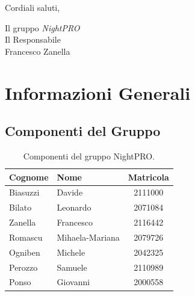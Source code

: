 \documentclass[a4paper, 11pt, oneside]{scrartcl} %
\begin{document}
\vspace{0.5cm}

Cordiali saluti,
\begin{flushright}
    Il gruppo \emph{NightPRO}\\[1cm]
    Il Responsabile\\[0.3cm]
    Francesco Zanella
\end{flushright}

\newpage
\section*{Informazioni Generali}

\subsection*{Componenti del Gruppo}

\begin{table}[h!]
\centering
\renewcommand{\arraystretch}{1.2} %
\begin{tabular}{@{}llc@{}}
\toprule
\textbf{Cognome} & \textbf{Nome} & \textbf{Matricola} \\
\midrule
Biasuzzi & Davide & 2111000 \\
Bilato & Leonardo & 2071084 \\
Zanella & Francesco & 2116442 \\
Romascu & Mihaela-Mariana & 2079726 \\
Ogniben & Michele & 2042325 \\
Perozzo & Samuele & 2110989 \\
Ponso & Giovanni & 2000558 \\
\bottomrule
\end{tabular}
\caption{Componenti del gruppo NightPRO.}
\end{table}
\end{document}
